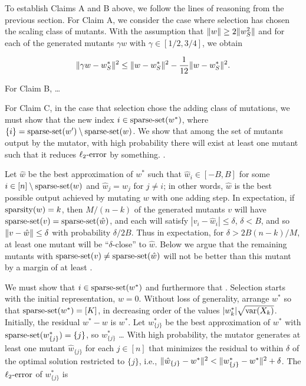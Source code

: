 To establish Claims A and B above, we follow the lines of reasoning from the
previous section.
For Claim A, we consider the case where selection has chosen the scaling class
of mutants.  With the assumption that $\Vert w \Vert \ge 2 \Vert w_S^2 \Vert$ and
for each of the generated mutants $\gamma w$ with $\gamma \in [1/2, 3/4]$,
we obtain

\[
\Vert \gamma w - w^*_S \Vert^2 \le \Vert w - w^*_S \Vert^2 - \frac{1}{12}\Vert w - w^*_S \Vert^2.
\]

For Claim B, \dots

For Claim C, in the case that selection chose the adding class of mutations,
we must show that the new index $i \in \mathrm{sparse\mbox{-}set}(w^*)$, where
$\{i\} = \mathrm{sparse\mbox{-}set}(w^\prime) \setminus \mathrm{sparse\mbox{-}set}(w)$.
We show that among the set of mutants output by the mutator, with high probability
there will exist at least one mutant such that it reduces $\mathrm{\ell_2\mbox{-}error}$ by something.
.

Let $\hat{w}$ be the best approximation of $w^*$ such that $\hat{w}_i \in [-B, B]$
for some $i \in [n] \setminus \mathrm{sparse\mbox{-}set}(w)$ and $\hat{w}_j = w_j$ for $j \neq i$;
in other words, $\hat{w}$ is the best possible output achieved by mutating $w$ with
one adding step.
In expectation, if $\mathrm{sparsity}(w) = k$, then $M / (n - k)$ of the generated mutants
$v$ will have $\mathrm{sparse\mbox{-}set}(v) = \mathrm{sparse\mbox{-}set}(\hat{w})$, and each will satisfy
$|v_i - \hat{w}_i| \le \delta$, $\delta < B$, and so
$\Vert v - \hat{w} \Vert \le \delta$ with probability $\delta/2B$.
Thus in expectation, for $\delta > 2B(n-k) / M$, at least one mutant will be
``$\delta$-close'' to $\hat{w}$.
Below we argue that the remaining mutants with
$\mathrm{sparse\mbox{-}set}(v) \neq \mathrm{sparse\mbox{-}set}(\hat{w})$ will not be better than this mutant by
a margin of at least .

We must show that $i \in \mathrm{sparse\mbox{-}set}(w^*)$ and furthermore that
.
Selection starts with the initial representation, $w=0$.
Without loss of generality, arrange $w^*$ so that $\mathrm{sparse\mbox{-}set}(w^*) = [K]$,
in decreasing order of the values $\vert w^*_k \vert \sqrt{\mathrm{var}(X_k)}$.
Initially, the residual $w^* - w$ is $w^*$.
Let $w^*_{\{j\}}$ be the best approximation of $w^*$ with
$\mathrm{sparse\mbox{-}set}(w^*_{\{j\}}) = \{j\}$, so $w^*_{\{j\}}$ \dots
With high probability, the mutator generates at least one mutant
$\hat{w}_{\{j\}}$ for each $j \in [n]$ that minimizes the residual to within
$\delta$ of the optimal solution restricted to $\{j\}$, i.e.,
$\Vert \hat{w}_{\{j\}} - w^* \Vert^2 < \Vert w^*_{\{j\}} - w^* \Vert^2 + \delta$.
The $\mathrm{\ell_2\mbox{-}error}$ of $w^*_{\{j\}}$ is

